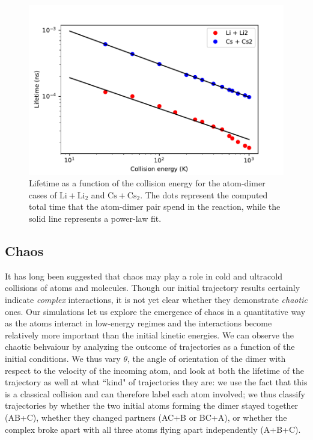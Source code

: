 \documentclass[%
 reprint,
 amsmath,amssymb,
 aps,
 nofootinbib
]{revtex4-1}
\begin{document}
\begin{figure}[ht]
\begin{center}
\includegraphics[width=1.1\linewidth]{lifetime.pdf}
\caption{Lifetime as a function of the collision energy for the atom-dimer cases of $\text{Li} + \text{Li}_2$ and $\text{Cs} + \text{Cs}_2$. The dots represent the computed total time that the atom-dimer pair spend in the reaction, while the solid line represents a power-law fit.}
\label{fig:lifetime}
\end{center}
\end{figure}


\subsection{\label{sec:level3}Chaos}

It has long been suggested that chaos may play a role in cold and ultracold collisions of atoms and molecules. Though our initial trajectory results certainly indicate \textit{complex} interactions, it is not yet clear whether they demonstrate \textit{chaotic} ones. Our simulations let us explore the emergence of chaos in a quantitative way as the atoms interact in low-energy regimes and the interactions become relatively more important than the initial kinetic energies. We can observe the chaotic behvaiour by analyzing the outcome of trajectories as a function of the initial conditions. We thus vary $\theta$, the angle of orientation of the dimer with respect to the velocity of the incoming atom, and look at both the lifetime of the trajectory as well at what ``kind" of trajectories they are: we use the fact that this is a classical collision and can therefore label each atom involved; we thus classify trajectories by whether the two initial atoms forming the dimer stayed together (AB+C), whether they changed partners (AC+B or BC+A), or whether the complex broke apart with all three atoms flying apart independently (A+B+C).
\end{document}
